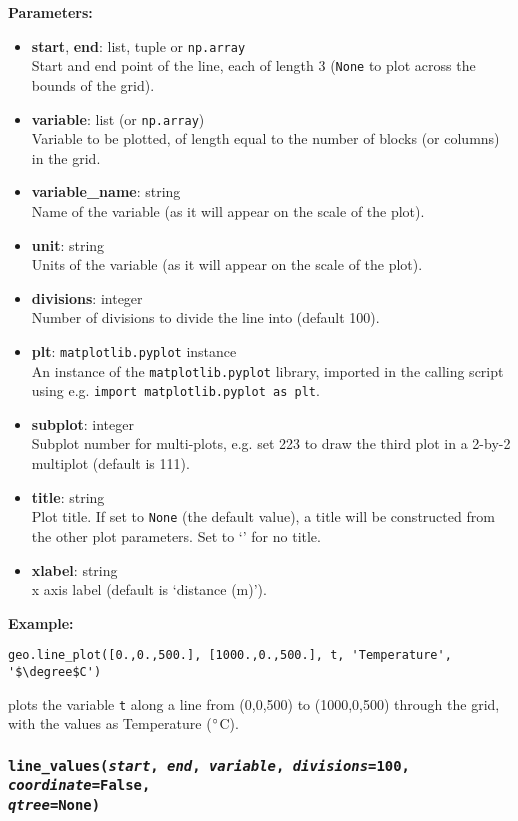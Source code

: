 \textbf{Parameters:}
\begin{itemize}
\item \textbf{start}, \textbf{end}: list, tuple or \texttt{np.array}\\
  Start and end point of the line, each of length 3 (\texttt{None} to plot across the bounds of the grid).
\item \textbf{variable}: list (or \texttt{np.array})\\
  Variable to be plotted, of length equal to the number of blocks (or columns) in the grid.
\item \textbf{variable\_name}: string\\
  Name of the variable (as it will appear on the scale of the plot).
\item \textbf{unit}: string\\
  Units of the variable (as it will appear on the scale of the plot).
\item \textbf{divisions}: integer\\
  Number of divisions to divide the line into (default 100).
\item \textbf{plt}: \texttt{matplotlib.pyplot} instance\\
  An instance of the \texttt{matplotlib.pyplot} library, imported in the calling script using e.g. \texttt{import matplotlib.pyplot as plt}.
\item \textbf{subplot}: integer\\
  Subplot number for multi-plots, e.g. set 223 to draw the third plot in a 2-by-2 multiplot (default is 111).
\item \textbf{title}: string\\
  Plot title.  If set to \texttt{None} (the default value), a title will be constructed from the other plot parameters.  Set to `' for no title.
\item \textbf{xlabel}: string\\
  x axis label (default is `distance (m)').
\end{itemize}

\textbf{Example:}

\begin{lstlisting}
geo.line_plot([0.,0.,500.], [1000.,0.,500.], t, 'Temperature', '$\degree$C')
\end{lstlisting}

plots the variable \texttt{t} along a line from (0,0,500) to (1000,0,500) through the grid, with the values as Temperature ($\degree$C).

\begin{snugshade}\subsubsection{\texttt{line\_values(\emph{start}, \emph{end}, \emph{variable}, \emph{divisions}=100, \emph{coordinate}=\texttt{False},\\
      \emph{qtree}=None)}}\end{snugshade}
\label{sec:mulgrid:line_values}


